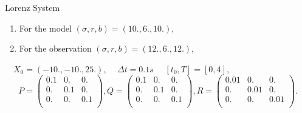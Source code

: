 \begin{frame}[allowframebreaks]{Lorenz System}
	\newpage
 
	\begin{enumerate}[\textbullet]
	     	\item For the model $(\sigma, r, b)=(10.,6.,10.)$,
	     	\item For the observation $(\sigma, r, b)=(12.,6.,12.)$,
	\end{enumerate}
	$\quad X_0=(-10.,-10.,25.)$, $\quad \Delta t=0.1s$ $\quad [t_0,T]=[0,4]$,
    $$P=\begin{pmatrix}
    0.1 & 0. & 0. \\
    0. & 0.1 & 0. \\
    0. & 0. & 0.1 \\
    \end{pmatrix} ,
    Q=\begin{pmatrix}
    0.1 & 0. & 0. \\
    0. & 0.1 & 0. \\
    0. & 0. & 0.1 \\
    \end{pmatrix},
    R=\begin{pmatrix}
    0.01 & 0. & 0. \\
    0. & 0.01 & 0. \\
    0. & 0. & 0.01 \\
    \end{pmatrix}.$$ 

	\begin{figure}
		\centering
    \end{figure}
\end{frame}
	